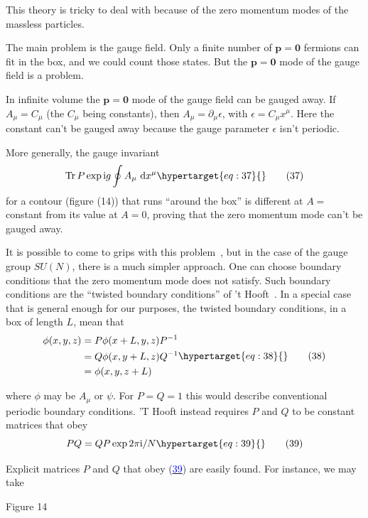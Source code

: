 \documentclass[11pt,a4paper]{article}
\newcommand{\eqtarget}[1]{\hypertarget{eq:#1}{\mathstrut}\tag{#1}}
\newcommand{\eqnref}[1]{(\hyperlink{eq:#1}{\textcolor{blue}{#1}})}
\newcommand{\dd}{\mathop{}\!\mathrm{d}}
\newcommand{\ii}{\mathrm{i}}
\begin{document}
This theory is tricky to deal with because of the zero momentum
modes of the massless particles.

The main problem is the gauge field. Only a finite number of
$\mathbf p = \mathbf 0$ fermions can fit in the box, and we could count those states.
But the $\mathbf p = \mathbf 0$ mode of the gauge field is a problem.

In infinite volume the $\mathbf p = \mathbf 0$ mode of the gauge field can be gauged
away. If $A_\mu = C_\mu$ (the $C_\mu$ being constants), then $A_\mu = \partial_\mu \epsilon$, with
$\epsilon = C_\mu x^\mu$. Here the constant can't be gauged away because the gauge
parameter $\epsilon$ isn't periodic.

More generally, the gauge invariant
\begin{equation}
\operatorname{Tr} P \exp \ii g \oint A_\mu\, \dd x^\mu
\eqtarget{37}
\end{equation}
for a contour (figure (14)) that runs ``around the box'' is different
at $A =$ constant from its value at $A = 0$, proving that the zero
momentum mode can't be gauged away.

It is possible to come to grips with this problem~\cite{ref12}, but in the
case of the gauge group $SU(N)$, there is a much simpler approach.
One can choose boundary conditions that the zero momentum mode does
not satisfy. Such boundary conditions are the ``twisted boundary
conditions'' of 't Hooft~\cite{ref13}. In a special case that is general enough
for our purposes, the twisted boundary conditions, in a box of length
$L$, mean that
\begin{equation}
\begin{aligned}
\phi(x,y,z) &= P \phi(x+L,y,z) P^{-1} \\
&= Q \phi(x,y+L,z) Q^{-1} \\
&= \phi(x,y,z+L)
\end{aligned}
\eqtarget{38}
\end{equation}
\noindent
\begin{minipage}[t]{0.58\textwidth}
where $\phi$ may be $A_\mu$ or $\psi$. For
$P = Q = 1$ this would describe conventional periodic boundary
conditions. 'T Hooft instead requires
$P$ and $Q$ to be constant matrices
that obey
\begin{equation}
PQ = QP \exp 2\pi \ii/N
\eqtarget{39}
\end{equation}

Explicit matrices $P$ and $Q$ that
obey \eqnref{39} are easily found. For
instance, we may take
\end{minipage}\hfill
\begin{minipage}[t]{0.32\textwidth}
\vspace{0pt}
\centering

\par\smallskip
Figure 14
\end{minipage}
\end{document}
